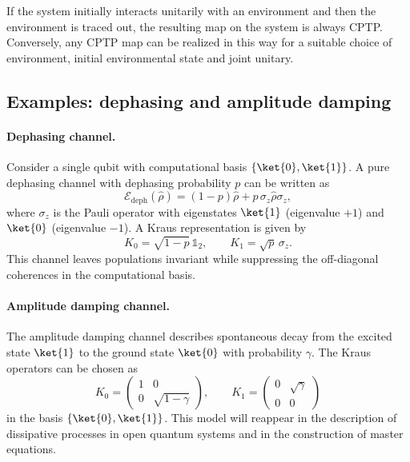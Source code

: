 If the system initially interacts unitarily with an environment and then the environment is traced out, the resulting map on the system is always CPTP. Conversely, any CPTP map can be realized in this way for a suitable choice of environment, initial environmental state and joint unitary.

\subsection{Examples: dephasing and amplitude damping}

\paragraph{Dephasing channel.}
Consider a single qubit with computational basis $\{\ket{0}, \ket{1}\}$.
A pure dephasing channel with dephasing probability $p$ can be written as
\begin{equation}
	\mathcal{E}_{\text{deph}}(\hat{\rho})
	=
	(1-p) \hat{\rho} + p \, \sigma_z \hat{\rho} \sigma_z,
\end{equation}
where $\sigma_z$ is the Pauli operator with eigenstates $\ket{1}$ (eigenvalue $+1$) and $\ket{0}$ (eigenvalue $-1$).
A Kraus representation is given by
\begin{equation}
	K_0 = \sqrt{1-p}\, \mathbb{1}_2,
	\qquad
	K_1 = \sqrt{p}\, \sigma_z.
\end{equation}
This channel leaves populations invariant while suppressing the off-diagonal coherences in the computational basis.

\paragraph{Amplitude damping channel.}
The amplitude damping channel describes spontaneous decay from the excited state $\ket{1}$ to the ground state $\ket{0}$ with probability $\gamma$. 
The Kraus operators can be chosen as
\begin{equation}
	K_0 =
	\begin{pmatrix}
		1 & 0 \\
		0 & \sqrt{1-\gamma}
	\end{pmatrix},
	\qquad
	K_1 =
	\begin{pmatrix}
		0 & \sqrt{\gamma} \\
		0 & 0
	\end{pmatrix}
\end{equation}
in the basis $\{\ket{0},\ket{1}\}$. 
This model will reappear in the description of dissipative processes in open quantum systems and in the construction of master equations.

